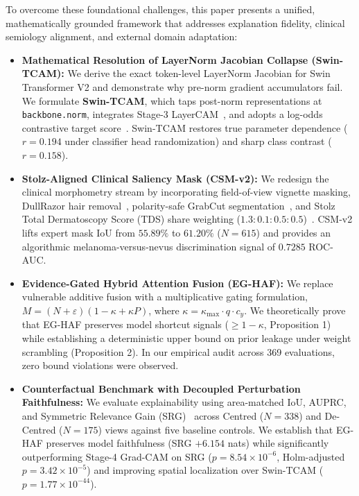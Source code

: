 \documentclass[11pt,a4paper]{article}
\begin{document}
To overcome these foundational challenges, this paper presents a unified, mathematically grounded framework that addresses explanation fidelity, clinical semiology alignment, and external domain adaptation:
\begin{itemize}
    \item \textbf{Mathematical Resolution of LayerNorm Jacobian Collapse (Swin-TCAM):} We derive the exact token-level LayerNorm Jacobian for Swin Transformer V2 and demonstrate why pre-norm gradient accumulators fail. We formulate \textbf{Swin-TCAM}, which taps post-norm representations at \texttt{backbone.norm}, integrates Stage-3 LayerCAM~\cite{jiang2021layercam}, and adopts a log-odds contrastive target score~\cite{selvaraju2017gradcam}. Swin-TCAM restores true parameter dependence ($r = 0.194$ under classifier head randomization) and sharp class contrast ($r = 0.158$).
    \item \textbf{Stolz-Aligned Clinical Saliency Mask (CSM-v2):} We redesign the clinical morphometry stream by incorporating field-of-view vignette masking, DullRazor hair removal~\cite{lee1997dullrazor}, polarity-safe GrabCut segmentation~\cite{rother2004grabcut}, and Stolz Total Dermatoscopy Score (TDS) share weighting ($1.3:0.1:0.5:0.5$)~\cite{stolz1994abcd}. CSM-v2 lifts expert mask IoU from $55.89\%$ to $61.20\%$ ($N=615$) and provides an algorithmic melanoma-versus-nevus discrimination signal of $0.7285$ ROC-AUC.
    \item \textbf{Evidence-Gated Hybrid Attention Fusion (EG-HAF):} We replace vulnerable additive fusion with a multiplicative gating formulation, $M = (N + \varepsilon)(1 - \kappa + \kappa P)$, where $\kappa = \kappa_{\max} \cdot q \cdot c_y$. We theoretically prove that EG-HAF preserves model shortcut signals ($\ge 1 - \kappa$, Proposition 1) while establishing a deterministic upper bound on prior leakage under weight scrambling (Proposition 2). In our empirical audit across 369 evaluations, zero bound violations were observed.
    \item \textbf{Counterfactual Benchmark with Decoupled Perturbation Faithfulness:} We evaluate explainability using area-matched IoU, AUPRC, and Symmetric Relevance Gain (SRG)~\cite{blucher2024decoupling} across Centred ($N=338$) and De-Centred ($N=175$) views against five baseline controls. We establish that EG-HAF preserves model faithfulness (SRG $+6.154$ nats) while significantly outperforming Stage-4 Grad-CAM on SRG ($p = 8.54 \times 10^{-6}$, Holm-adjusted $p = 3.42 \times 10^{-5}$) and improving spatial localization over Swin-TCAM ($p = 1.77 \times 10^{-44}$).

\end{itemize}
\end{document}
